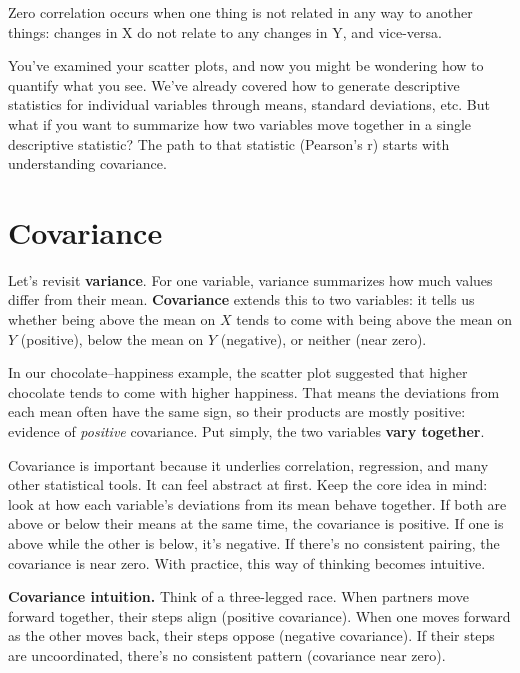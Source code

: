 \documentclass[
  letterpaper,
  DIV=11,
  numbers=noendperiod]{scrreprt}
\begin{document}
Zero correlation occurs when one thing is not related in any way to
another things: changes in X do not relate to any changes in Y, and
vice-versa.

You've examined your scatter plots, and now you might be wondering how
to quantify what you see. We've already covered how to generate
descriptive statistics for individual variables through means, standard
deviations, etc. But what if you want to summarize how two variables
move together in a single descriptive statistic? The path to that
statistic (Pearson's r) starts with understanding covariance.

\section{Covariance}\label{covariance}

Let's revisit \textbf{variance}. For one variable, variance summarizes
how much values differ from their mean. \textbf{Covariance} extends this
to two variables: it tells us whether being above the mean on \(X\)
tends to come with being above the mean on \(Y\) (positive), below the
mean on \(Y\) (negative), or neither (near zero).

In our chocolate--happiness example, the scatter plot suggested that
higher chocolate tends to come with higher happiness. That means the
deviations from each mean often have the same sign, so their products
are mostly positive: evidence of \emph{positive} covariance. Put simply,
the two variables \textbf{vary together}.

Covariance is important because it underlies correlation, regression,
and many other statistical tools. It can feel abstract at first. Keep
the core idea in mind: look at how each variable's deviations from its
mean behave together. If both are above or below their means at the same
time, the covariance is positive. If one is above while the other is
below, it's negative. If there's no consistent pairing, the covariance
is near zero. With practice, this way of thinking becomes intuitive.

\begin{tcolorbox}[enhanced jigsaw, breakable, colback=white, opacitybacktitle=0.6, coltitle=black, toprule=.15mm, bottomtitle=1mm, leftrule=.75mm, arc=.35mm, title=\textcolor{quarto-callout-note-color}{\faInfo}\hspace{0.5em}{Note}, opacityback=0, colframe=quarto-callout-note-color-frame, left=2mm, titlerule=0mm, toptitle=1mm, colbacktitle=quarto-callout-note-color!10!white, rightrule=.15mm, bottomrule=.15mm]

\textbf{Covariance intuition.} Think of a three-legged race. When
partners move forward together, their steps align (positive covariance).
When one moves forward as the other moves back, their steps oppose
(negative covariance). If their steps are uncoordinated, there's no
consistent pattern (covariance near zero).

\end{tcolorbox}
\end{document}
